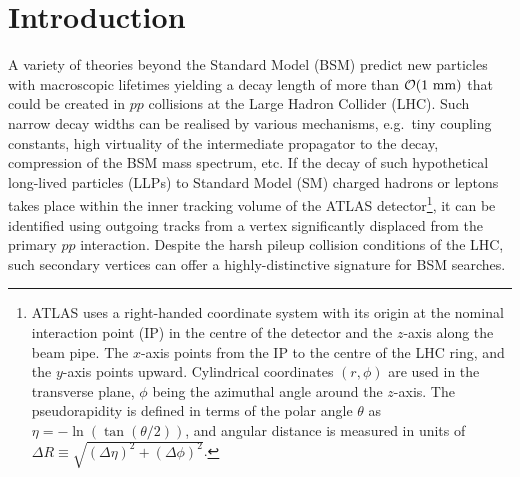 \documentclass[PUB,UKenglish, texlive=2018]{\ATLASLATEXPATH atlasdoc}
\begin{document}
\maketitle



\section{Introduction \label{sec:intro}}

A variety of theories beyond the Standard Model (BSM) predict new particles with macroscopic lifetimes yielding a decay length of more than ${\cal O}(1~{\rm mm})$ that could be created in $pp$ collisions at the Large Hadron Collider (LHC).
Such narrow decay widths can be realised by various mechanisms, e.g.~tiny coupling constants, high virtuality of the intermediate propagator to the decay, compression of the BSM mass spectrum, etc. 
If the decay of such hypothetical long-lived particles (LLPs) to Standard Model (SM) charged hadrons or leptons takes place within the inner tracking volume of the ATLAS detector\footnote{ATLAS uses a right-handed coordinate system with its origin at the nominal interaction point (IP) in the centre of the detector and the $z$-axis along the beam pipe. 
The $x$-axis points from the IP to the centre of the LHC ring, and the $y$-axis points upward. Cylindrical coordinates $(r, \phi)$ are used in the transverse plane, $\phi$ being the azimuthal angle around the $z$-axis. 
The pseudorapidity is defined in terms of the polar angle $\theta$ as $\eta = -\ln(\tan(\theta/2))$, and angular distance is measured in units of $\Delta R \equiv \sqrt{(\Delta\eta)^{2} + (\Delta\phi)^{2}}$.}, it can be identified using outgoing tracks from a vertex significantly displaced from the primary $pp$ interaction. 
Despite the harsh pileup collision conditions of the LHC, 
such secondary vertices can offer a highly-distinctive signature for BSM searches.
\end{document}
